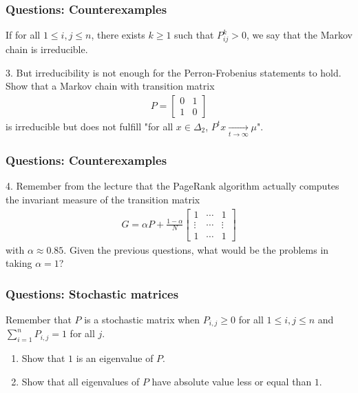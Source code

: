 \documentclass{beamer}
\begin{document}
\begin{frame}[t]
\frametitle{Questions: Counterexamples}
\vspace{-10pt}
\begin{definition}
If for all $1 \leq i,j \leq n$, there exists $k \geq 1$ such that $P^{k}_{ij} > 0$, we say that the Markov chain is irreducible.
\end{definition}
3. But irreducibility is not enough for the Perron-Frobenius statements to hold. Show that a Markov chain with transition matrix
\begin{align*}
P = 
\begin{bmatrix}
0 & 1 \\
1 & 0
\end{bmatrix}
\end{align*}
is irreducible but does not fulfill "for all $x \in \Delta_2$,  $P^t x \xrightarrow[t \to \infty]{} \mu$".
\pause
\end{frame}

\begin{frame}[t]
\frametitle{Questions: Counterexamples}
4. Remember from the lecture that the PageRank algorithm actually computes the invariant measure of the transition matrix
\begin{align*}
G = \alpha P + \frac{1-\alpha}{N} 
\begin{bmatrix} 
1 & \cdots & 1 \\
\vdots & \cdots & \vdots \\
1 & \cdots & 1
\end{bmatrix}
\end{align*}
with $\alpha \approx 0.85$. Given the previous questions, what would be the problems in taking $\alpha = 1$? 
\pause
\end{frame}

\begin{frame}[t]
\frametitle{Questions: Stochastic matrices}
Remember that  $P$ is a stochastic matrix when $P_{i,j} \geq 0$ for all $1 \leq i,j \leq n$ and $\sum_{i=1}^n P_{i,j} = 1$ for all $j$. 
\begin{enumerate}
\item Show that $1$ is an eigenvalue of $P$.
\item Show that all eigenvalues of $P$ have absolute value less or equal than $1$.
\end{enumerate}
\pause
\pause
\end{frame}
\end{document}
